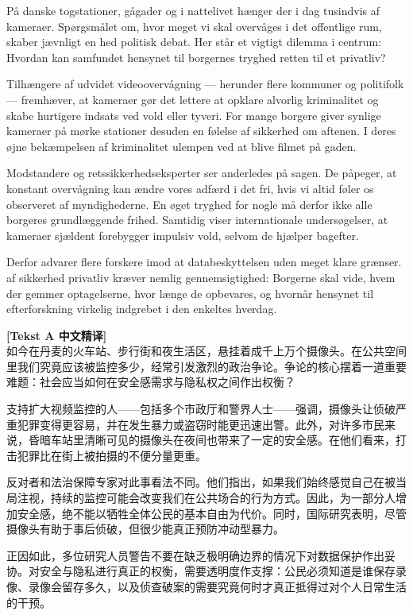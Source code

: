 På danske togstationer, gågader og i nattelivet hænger der i dag tusindvis af kameraer. Spørgsmålet om, hvor meget vi skal overvåges i det offentlige rum, skaber jævnligt en hed politisk debat. Her står et vigtigt dilemma i centrum: Hvordan kan samfundet  hensynet til borgernes tryghed  retten til et privatliv?

Tilhængere af udvidet videoovervågning --- herunder flere kommuner og politifolk --- fremhæver, at kameraer gør det lettere at opklare alvorlig kriminalitet og skabe hurtigere indsats ved vold eller tyveri. For mange borgere giver synlige kameraer på mørke stationer desuden en følelse af sikkerhed om aftenen. I deres øjne  bekæmpelsen af kriminalitet  ulempen ved at blive filmet på gaden.

Modstandere og retssikkerhedseksperter ser anderledes på sagen. De påpeger, at konstant overvågning kan ændre vores adfærd i det fri, hvis vi altid føler os observeret af myndighederne. En øget tryghed for nogle må derfor ikke  alle borgeres grundlæggende frihed. Samtidig viser internationale undersøgelser, at kameraer sjældent forebygger impulsiv vold, selvom de hjælper bagefter.

Derfor advarer flere forskere imod at  databeskyttelsen uden meget klare grænser.  af sikkerhed  privatliv kræver nemlig gennemsigtighed: Borgerne skal vide, hvem der gemmer optagelserne, hvor længe de opbevares, og hvornår hensynet til efterforskning virkelig  indgrebet i den enkeltes hverdag.

\begin{transbox}
\small
\textbf{\color{NCDTeal}[Tekst A 中文精译]}\\
如今在丹麦的火车站、步行街和夜生活区，悬挂着成千上万个摄像头。在公共空间里我们究竟应该被监控多少，经常引发激烈的政治争论。争论的核心摆着一道重要难题：社会应当如何在安全感需求与隐私权之间作出权衡？

支持扩大视频监控的人——包括多个市政厅和警界人士——强调，摄像头让侦破严重犯罪变得更容易，并在发生暴力或盗窃时能更迅速出警。此外，对许多市民来说，昏暗车站里清晰可见的摄像头在夜间也带来了一定的安全感。在他们看来，打击犯罪比在街上被拍摄的不便分量更重。

反对者和法治保障专家对此事看法不同。他们指出，如果我们始终感觉自己在被当局注视，持续的监控可能会改变我们在公共场合的行为方式。因此，为一部分人增加安全感，绝不能以牺牲全体公民的基本自由为代价。同时，国际研究表明，尽管摄像头有助于事后侦破，但很少能真正预防冲动型暴力。

正因如此，多位研究人员警告不要在缺乏极明确边界的情况下对数据保护作出妥协。对安全与隐私进行真正的权衡，需要透明度作支撑：公民必须知道是谁保存录像、录像会留存多久，以及侦查破案的需要究竟何时才真正抵得过对个人日常生活的干预。
\end{transbox}

